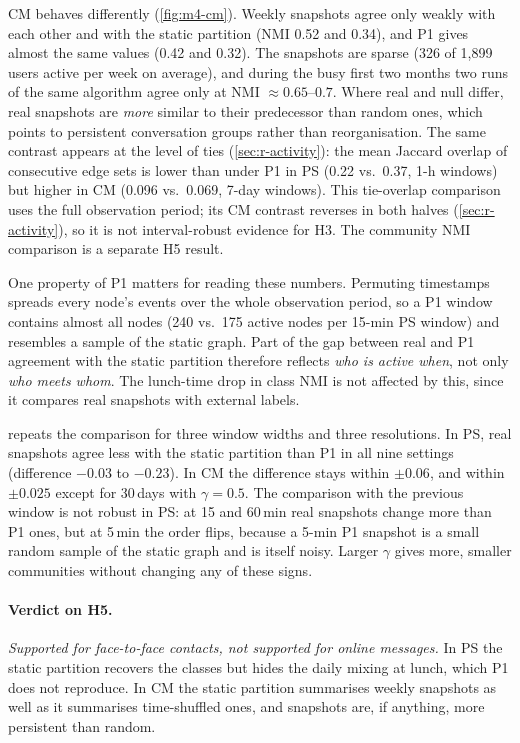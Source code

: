 CM behaves differently (\cref{fig:m4-cm}). Weekly snapshots agree only weakly with each
other and with the static partition (NMI 0.52 and 0.34), and P1 gives almost the same
values (0.42 and 0.32). The snapshots are sparse (326 of 1{,}899 users active per week on
average), and during the busy first two months two runs of the same algorithm agree only
at NMI $\approx 0.65$--$0.7$. Where real and null differ, real snapshots are \emph{more}
similar to their predecessor than random ones, which points to persistent conversation
groups rather than reorganisation. The same contrast appears at the level of ties
(\cref{sec:r-activity}): the mean Jaccard overlap of consecutive edge sets is lower than
under P1 in PS (0.22 vs.\ 0.37, 1-h windows) but higher in CM (0.096 vs.\ 0.069, 7-day
windows). This tie-overlap comparison uses the full observation period; its CM
contrast reverses in both halves (\cref{sec:r-activity}), so it is not interval-robust
evidence for H3. The community NMI comparison is a separate H5 result.

One property of P1 matters for reading these numbers. Permuting timestamps spreads every
node's events over the whole observation period, so a P1 window contains almost all nodes
(240 vs.\ 175 active nodes per 15-min PS window) and resembles a sample of the static
graph. Part of the gap between real and P1 agreement with the static partition therefore
reflects \emph{who is active when}, not only \emph{who meets whom}. The lunch-time drop
in class NMI is not affected by this, since it compares real snapshots with external
labels.

 repeats the comparison for three window widths and three resolutions.
In PS, real snapshots agree less with the static partition than P1 in all nine settings
(difference $-0.03$ to $-0.23$). In CM the difference stays within $\pm0.06$, and within
$\pm0.025$ except for 30\,days with $\gamma=0.5$. The comparison with the previous window
is not robust in PS: at 15 and 60\,min real snapshots change more than P1 ones, but at
5\,min the order flips, because a 5-min P1 snapshot is a small random sample of the static
graph and is itself noisy. Larger $\gamma$ gives more, smaller communities without changing
any of these signs.

\paragraph{Verdict on H5.}
\emph{Supported for face-to-face contacts, not supported for online messages.} In PS the
static partition recovers the classes but hides the daily mixing at lunch, which P1 does
not reproduce. In CM the static partition summarises weekly snapshots as well as it
summarises time-shuffled ones, and snapshots are, if anything, more persistent than random.
